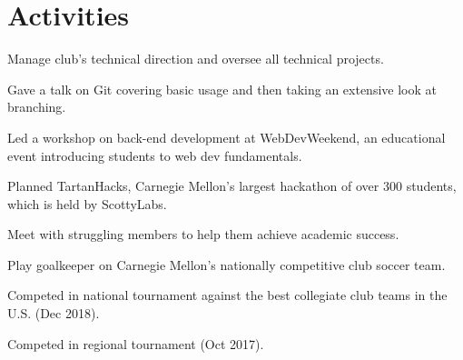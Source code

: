 \documentclass[]{openfont}
\begin{document}
\begin{minipage}[t]{0.60\textwidth}
\sectionsep


\section{Activities} 
\begin{tightemize}
    \item Manage club's technical direction and oversee all technical projects.
    \item Gave a talk on Git covering basic usage and then taking an extensive
        look at branching.
    \item Led a workshop on back-end development at WebDevWeekend, an
        educational event introducing students to web dev fundamentals.
    \item Planned TartanHacks, Carnegie Mellon's largest hackathon of over 300 students, which is held by ScottyLabs.
\end{tightemize}

\sectionsep

\begin{tightemize}
    \item Meet with struggling members to help them achieve academic success.
\end{tightemize}

\sectionsep

\begin{tightemize}
    \item Play goalkeeper on Carnegie Mellon's nationally competitive club soccer team.
    \item Competed in national tournament against the best collegiate club teams
        in the U.S. (Dec 2018).
    \item Competed in regional tournament (Oct 2017).
\end{tightemize}

\sectionsep

\end{minipage} 
\end{document}
